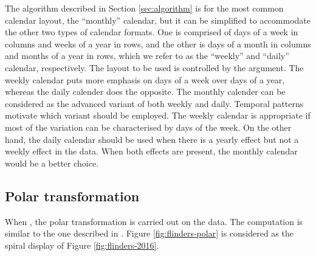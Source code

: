 \documentclass[article]{jss}
\theoremstyle{definition}
\theoremstyle{definition}
\theoremstyle{remark}
\begin{document}
The algorithm described in Section \ref{sec:algorithm} is for the most
common calendar layout, the ``monthly'' calendar, but it can be
simplified to accommodate the other two types of calendar formats. One
is comprised of days of a week in columns and weeks of a year in rows,
and the other is days of a month in columns and months of a year in
rows, which we refer to as the ``weekly'' and ``daily'' calendar,
respectively. The layout to be used is controlled by the 
argument. The weekly calendar puts more emphasis on days of a week over
days of a year, whereas the daily calender does the opposite. The
monthly calender can be considered as the advanced variant of both
weekly and daily. Temporal patterns motivate which variant should be
employed. The weekly calendar is appropriate if most of the variation
can be characterised by days of the week. On the other hand, the daily
calendar should be used when there is a yearly effect but not a weekly
effect in the data. When both effects are present, the monthly calendar
would be a better choice.

\subsection{Polar transformation}\label{polar-transformation}

When , the polar transformation is carried out on the
data. The computation is similar to the one described in
\citet{Wickham2012glyph}. Figure \ref{fig:flinders-polar} is considered
as the spiral display of Figure \ref{fig:flinders-2016}.
\end{document}
